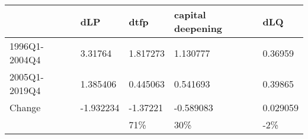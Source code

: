 \begin{tabular}{lllll}
\toprule
{} &       dLP &      dtfp & capital deepening &       dLQ \\
\midrule
1996Q1-2004Q4 &   3.31764 &  1.817273 &          1.130777 &   0.36959 \\
2005Q1-2019Q4 &  1.385406 &  0.445063 &          0.541693 &   0.39865 \\
Change        & -1.932234 &  -1.37221 &         -0.589083 &  0.029059 \\
              &           &       71\% &               30\% &       -2\% \\
\bottomrule
\end{tabular}
